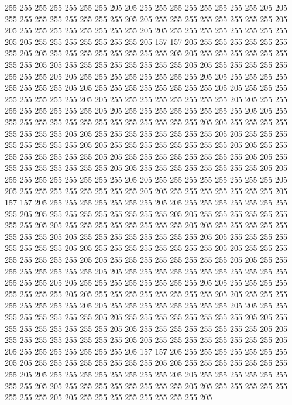255 255 255 255 255 255 255 205 205 255 255 255 255 255 255 255 255 205 205 255
255 255 255 255 255 255 255 205 205 255 255 255 255 255 255 255 255 205 205 255
255 255 255 255 255 255 255 205 205 255 255 255 255 255 255 255 255 205 205 255
255 255 255 255 255 255 205 157 157 205 255 255 255 255 255 255 255 205 205 255
255 255 255 255 255 255 255 205 205 255 255 255 255 255 255 255 255 205 205 255
255 255 255 255 255 255 255 205 205 255 255 255 255 255 255 255 255 205 205 255
255 255 255 255 255 255 255 205 205 255 255 255 255 255 255 255 255 205 205 255
255 255 255 255 255 255 255 205 205 255 255 255 255 255 255 255 255 205 205 255
255 255 255 255 255 255 255 205 205 255 255 255 255 255 255 255 255 205 205 255
255 255 255 255 255 255 255 205 205 255 255 255 255 255 255 255 255 255 255 255
255 255 255 205 205 255 255 255 255 255 255 255 255 205 205 255 255 255 255 255
255 255 255 205 205 255 255 255 255 255 255 255 255 205 205 255 255 255 255 255
255 255 255 205 205 255 255 255 255 255 255 255 255 205 205 255 255 255 255 255
255 255 255 205 205 255 255 255 255 255 255 255 255 205 205 255 255 255 255 255
255 255 255 205 205 255 255 255 255 255 255 255 255 205 205 255 255 255 255 255
255 255 255 205 205 255 255 255 255 255 255 255 255 205 205 255 255 255 255 255
255 255 205 157 157 205 255 255 255 255 255 255 255 205 205 255 255 255 255 255
255 255 255 205 205 255 255 255 255 255 255 255 255 205 205 255 255 255 255 255
255 255 255 205 205 255 255 255 255 255 255 255 255 205 205 255 255 255 255 255
255 255 255 205 205 255 255 255 255 255 255 255 255 205 205 255 255 255 255 255
255 255 255 205 205 255 255 255 255 255 255 255 255 205 205 255 255 255 255 255
255 255 255 205 205 255 255 255 255 255 255 255 255 205 205 255 255 255 255 255
255 255 255 205 205 255 255 255 255 255 255 255 255 255 255 255 255 255 255 205
205 255 255 255 255 255 255 255 255 205 205 255 255 255 255 255 255 255 255 205
205 255 255 255 255 255 255 255 255 205 205 255 255 255 255 255 255 255 255 205
205 255 255 255 255 255 255 255 255 205 205 255 255 255 255 255 255 255 255 205
205 255 255 255 255 255 255 255 255 205 205 255 255 255 255 255 255 255 255 205
205 255 255 255 255 255 255 255 255 205 205 255 255 255 255 255 255 255 255 205
205 255 255 255 255 255 255 255 255 205 205 255 255 255 255 255 255 255 205 157
157 205 255 255 255 255 255 255 255 205 205 255 255 255 255 255 255 255 255 205
205 255 255 255 255 255 255 255 255 205 205 255 255 255 255 255 255 255 255 205
205 255 255 255 255 255 255 255 255 205 205 255 255 255 255 255 255 255 255 205
205 255 255 255 255 255 255 255 255 205 205 255 255 255 255 255 255 255 255 205
